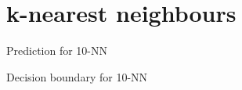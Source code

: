 \section{k-nearest neighbours}

\begin{frame}{Prediction for 10-NN}
\end{frame}

\begin{frame}{Decision boundary for 10-NN}
\end{frame}
